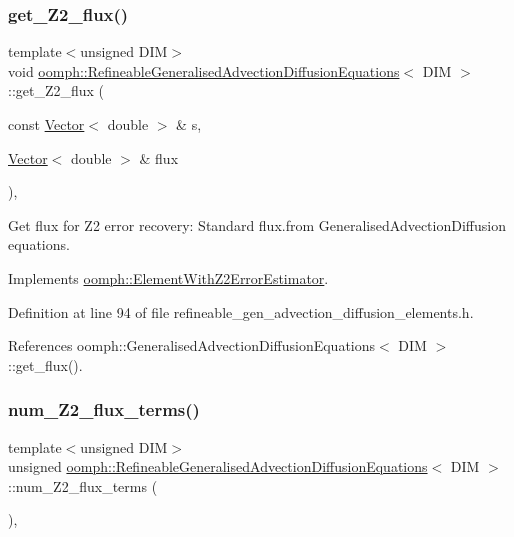 \subsubsection{\texorpdfstring{get\+\_\+\+Z2\+\_\+flux()}{get\_Z2\_flux()}}
{\footnotesize\ttfamily template$<$unsigned D\+IM$>$ \\
void \hyperlink{classoomph_1_1RefineableGeneralisedAdvectionDiffusionEquations}{oomph\+::\+Refineable\+Generalised\+Advection\+Diffusion\+Equations}$<$ D\+IM $>$\+::get\+\_\+\+Z2\+\_\+flux (\begin{DoxyParamCaption}\item[{const \hyperlink{classoomph_1_1Vector}{Vector}$<$ double $>$ \&}]{s,  }\item[{\hyperlink{classoomph_1_1Vector}{Vector}$<$ double $>$ \&}]{flux }\end{DoxyParamCaption})\hspace{0.3cm}{\ttfamily [inline]}, {\ttfamily [virtual]}}



Get \textquotesingle{}flux\textquotesingle{} for Z2 error recovery\+: Standard flux.\+from Generalised\+Advection\+Diffusion equations. 



Implements \hyperlink{classoomph_1_1ElementWithZ2ErrorEstimator_a5688ff5f546d81771cabad82ca5a7556}{oomph\+::\+Element\+With\+Z2\+Error\+Estimator}.



Definition at line 94 of file refineable\+\_\+gen\+\_\+advection\+\_\+diffusion\+\_\+elements.\+h.



References oomph\+::\+Generalised\+Advection\+Diffusion\+Equations$<$ D\+I\+M $>$\+::get\+\_\+flux().

\mbox{\label{classoomph_1_1RefineableGeneralisedAdvectionDiffusionEquations_acfd093a30da3a18eb1d86f24b48ab594}} 
\subsubsection{\texorpdfstring{num\+\_\+\+Z2\+\_\+flux\+\_\+terms()}{num\_Z2\_flux\_terms()}}
{\footnotesize\ttfamily template$<$unsigned D\+IM$>$ \\
unsigned \hyperlink{classoomph_1_1RefineableGeneralisedAdvectionDiffusionEquations}{oomph\+::\+Refineable\+Generalised\+Advection\+Diffusion\+Equations}$<$ D\+IM $>$\+::num\+\_\+\+Z2\+\_\+flux\+\_\+terms (\begin{DoxyParamCaption}{ }\end{DoxyParamCaption})\hspace{0.3cm}{\ttfamily [inline]}, {\ttfamily [virtual]}}



